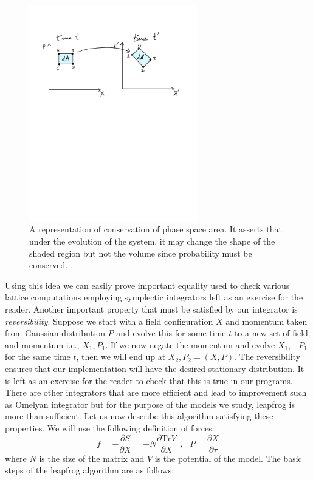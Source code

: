 \documentclass[letter,11pt]{article}
\begin{document}
\begin{figure}[htbp] 
	\centering 
	\includegraphics[width=0.65\textwidth]{figs/PSP.pdf}
	\caption{\label{fig:PSP1}A representation of conservation of phase space area. It asserts that under the evolution of the system, it may change the shape of the shaded region but not the volume since probability must be conserved.}
\end{figure}
Using this idea we can easily prove important equality used to check various lattice computations employing symplectic integrators left as an exercise for the reader. 
Another important property that must be satisfied by our integrator is \emph{reversibility}. Suppose we start with a field configuration $X$ and momentum taken from Gaussian distribution $P$ and evolve this for some time $t$ to a new set of field and momentum i.e., $X_{1},P_{1}$. If we now negate the momentum and evolve 
$X_{1},-P_{1} $ for the same time $t$, then we will end up at $X_{2},P_{2} = (X,P)$. The reversibility ensures that our implementation will have the desired stationary distribution. It is left as an exercise for the reader to check that this is true in our programs. There are other integrators that are more efficient and lead to improvement such as Omelyan integrator but for the purpose of the models we study, leapfrog is more than sufficient. Let us now describe this algorithm satisfying these properties. We will use the following definition of forces:
\begin{equation}
	f = -\frac{\partial S}{\partial X} = -N\frac{\partial \mbox{Tr} V}{\partial X} ~~,~~~ P = \frac{\partial X}{\partial \tau}
\end{equation} 
where $N$ is the size of the matrix and $V$ is the potential of the model. The basic steps of the leapfrog algorithm are as follows:
\end{document}
